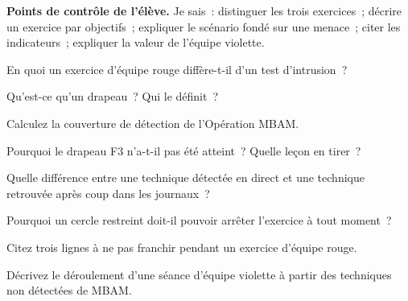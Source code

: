 \begin{boxinfo}
\textbf{Points de contrôle de l'élève.} Je sais~: distinguer les trois
exercices~; décrire un exercice par objectifs~; expliquer le scénario fondé
sur une menace~; citer les indicateurs~; expliquer la valeur de l'équipe
violette.
\end{boxinfo}

\bigskip

\begin{boxexo}[title={\ding{45}\quad Exercice~20.1. Distinction \niveaubase}]
En quoi un exercice d'équipe rouge diffère-t-il d'un test d'intrusion~?
\end{boxexo}

\begin{boxexo}[title={\ding{45}\quad Exercice~20.2. Drapeaux \niveaubase}]
Qu'est-ce qu'un drapeau~? Qui le définit~?
\end{boxexo}

\begin{boxexo}[title={\ding{45}\quad Exercice~20.3. Couverture \niveaubase}]
Calculez la couverture de détection de l'Opération MBAM.
\end{boxexo}

\begin{boxexo}[title={\ding{45}\quad Exercice~20.4. F3 \niveaumoyen}]
Pourquoi le drapeau F3 n'a-t-il pas été atteint~? Quelle leçon en tirer~?
\end{boxexo}

\begin{boxexo}[title={\ding{45}\quad Exercice~20.5. Détecté après coup \niveaumoyen}]
Quelle différence entre une technique détectée en direct et une technique
retrouvée après coup dans les journaux~?
\end{boxexo}

\begin{boxexo}[title={\ding{45}\quad Exercice~20.6. Cercle de confiance \niveaumoyen}]
Pourquoi un cercle restreint doit-il pouvoir arrêter l'exercice à tout
moment~?
\end{boxexo}

\begin{boxexo}[title={\ding{45}\quad Exercice~20.7. Lignes rouges \niveaumoyen}]
Citez trois lignes à ne pas franchir pendant un exercice d'équipe rouge.
\end{boxexo}

\begin{boxexo}[title={\ding{45}\quad Exercice~20.8. Violette \niveaumoyen}]
Décrivez le déroulement d'une séance d'équipe violette à partir des
techniques non détectées de MBAM.
\end{boxexo}

